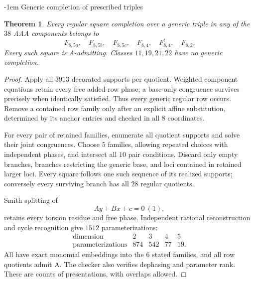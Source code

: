 \documentclass[11pt,a4paper]{article}
\makeatletter
\newtheorem{theorem}{Theorem}[section]
\theoremstyle{plain}
\theoremstyle{definition}
\numberwithin{equation}{section}
\renewcommand\subsection{\@startsection{subsection}{2}{\z@}  {\medskipamount}  {-1em}  {\normalfont\normalsize\bfseries}}
\makeatother
\begin{document}
\subsection{Generic completion of prescribed triples}\label{sec:genericrows}\label{sec:genericsquares}
\begin{theorem}\label{thm:generic}
Every regular square completion over a generic triple in any of the $38$ AAA components belongs to
$$F_{8,5a},\quad F_{8,5b},\quad F_{8,5c},\quad F_{8,4},\quad F_{8,4}^{t},\quad F_{8,2}.$$
Every such square is A-admitting. Classes $11,19,21,22$ have no generic completion.
\end{theorem}
\begin{proof}
Apply all $3913$ decorated supports per quotient. Weighted component equations retain every free added-row phase; a base-only congruence survives precisely when identically satisfied. Thus every generic regular row occurs. Remove a contained row family only after an explicit affine substitution, determined by its anchor entries and checked in all $8$ coordinates.

For every pair of retained families, enumerate all quotient supports and solve their joint congruences. Choose $5$ families, allowing repeated choices with independent phases, and intersect all $10$ pair conditions. Discard only empty branches, branches restricting the generic base, and loci contained in retained larger loci. Every square follows one such sequence of its realized supports; conversely every surviving branch has all $28$ regular quotients.

Smith splitting of
$$A y+B x+c=0\ (1),$$
retains every torsion residue and free phase. Independent rational reconstruction and cycle recognition give $1512$ parameterizations:
$$
\begin{array}{c|rrrr}
\text{dimension}&2&3&4&5\\\hline
\text{parameterizations}&874&542&77&19.
\end{array}
$$
All have exact monomial embeddings into the $6$ stated families, and all row quotients admit A. The checker also verifies dephasing and parameter rank. These are counts of presentations, with overlaps allowed.
\end{proof}
\end{document}
